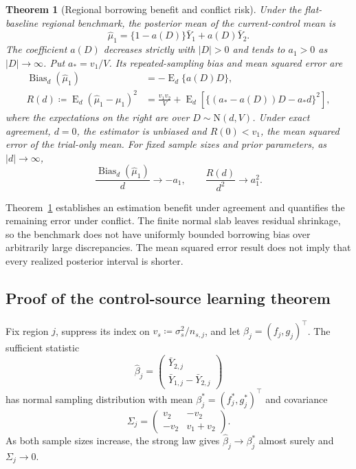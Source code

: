 \documentclass[11pt]{article}
\newcommand{\E}{\operatorname{E}}
\newcommand{\N}{\mathrm{N}}
\newtheorem{theorem}{Theorem}
\theoremstyle{remark}\newtheorem{remark}{Remark}[section]
\providecommand{\DIFaddtex}[1]{{\protect\color{blue} \sf #1}} %
\providecommand{\DIFaddbegin}{} %
\providecommand{\DIFaddend}{} %
\providecommand{\DIFadd}[1]{\texorpdfstring{\DIFaddtex{#1}}{#1}} %
\begin{document}
\begin{theorem}[Regional borrowing benefit and conflict risk]\label{thm:borrowing_risk}
\DIFadd{Under the }\DIFaddend flat-baseline  \DIFaddbegin \DIFadd{regional benchmark, the posterior mean of the current-control mean is
}\begin{equation}\label{eq:regional_estimator}
\widehat\mu_1=\{1-a(D)\}\bar Y_1+a(D)\bar Y_2.
\end{equation}
\DIFadd{The coefficient $a(D)$ decreases strictly with $|D|>0$ and tends to $a_1>0$ as $|D|\to\infty$. Put $a_*=v_1/V$. Its repeated-sampling bias and mean squared error are
}\begin{equation}\label{eq:regional_risk}
\begin{aligned}
\operatorname{Bias}_d(\widehat\mu_1)&=-\E_d\{a(D)D\},\\
R(d)\coloneqq\E_d(\widehat\mu_1-\mu_1)^2
&=\frac{v_1v_2}{V}
+\E_d\!\left[\{(a_*-a(D))D-a_*d\}^2\right],
\end{aligned}
\end{equation}
\DIFadd{where the expectations on the right are over $D\sim\N(d,V)$. Under exact agreement, $d=0$, the estimator is unbiased and $R(0)<v_1$, the mean squared error of the trial-only mean. For fixed sample sizes and prior parameters, as $|d|\to\infty$,
}\[
\frac{\operatorname{Bias}_d(\widehat\mu_1)}{d}\longrightarrow-a_1,
\qquad \frac{R(d)}{d^2}\longrightarrow a_1^2.
\]
\end{theorem}
\DIFadd{Theorem~\ref{thm:borrowing_risk} establishes an estimation benefit under agreement and quantifies the remaining error under conflict. The finite normal slab leaves residual shrinkage, so the benchmark does not have uniformly bounded borrowing bias over arbitrarily large discrepancies. The mean squared error result does not imply that every realized posterior interval is shorter}\DIFaddend .

\subsection{Proof of  \DIFaddbegin \DIFadd{the control-source learning theorem}\DIFaddend }\label{sec:C.2}
Fix region $j$, suppress its index on $v_s\coloneqq\sigma_s^2/n_{s,j}$, and let $\beta_j=(f_j,g_j)^\top$. The sufficient statistic
\begin{equation}\label{eq:regional_sufficient}
\widehat\beta_j=
\begin{pmatrix}\bar Y_{2,j}\\\bar Y_{1,j}-\bar Y_{2,j}\end{pmatrix}
\end{equation}
has normal sampling distribution with mean $\beta_j^*=(f_j^*,g_j^*)^\top$ and covariance
\begin{equation}\label{eq:regional_sampling_covariance}
\Sigma_j=\begin{pmatrix}v_2&-v_2\\-v_2&v_1+v_2\end{pmatrix}.
\end{equation}
As both sample sizes increase, the strong law gives $\widehat\beta_j\to\beta_j^*$ almost surely and $\Sigma_j\to0$.
\end{document}
